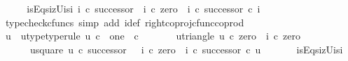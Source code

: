 \begin{isabellebody}
\ \ \isamarkupfalse%
\ \isamarkupfalse%
\ i{}{\isacharunderscore}{\kern0pt}sEqs{\isacharunderscore}{\kern0pt}i{}zUi{}s{\isacharunderscore}{\kern0pt}i{}{\isacharcolon}{\kern0pt}\ {\isachardoublequoteopen}i{}\ {\isasymcirc}\isactrlsub c\ successor\ {\isacharequal}{\kern0pt}\ {\isacharparenleft}{\kern0pt}{\isacharparenleft}{\kern0pt}i{}\ {\isasymcirc}\isactrlsub c\ zero{\isacharparenright}{\kern0pt}\ {\isasymamalg}\ {\isacharparenleft}{\kern0pt}i{}\ {\isasymcirc}\isactrlsub c\ successor{\isacharparenright}{\kern0pt}{\isacharparenright}{\kern0pt}\ {\isasymcirc}\isactrlsub c\ i{}{\isachardoublequoteclose}\isanewline
\ \ \ \ \isamarkupfalse%
\ {\isacharparenleft}{\kern0pt}typecheck{\isacharunderscore}{\kern0pt}cfuncs{\isacharcomma}{\kern0pt}\ simp\ add{\isacharcolon}{\kern0pt}\ i{}{\isacharunderscore}{\kern0pt}def\ right{\isacharunderscore}{\kern0pt}coproj{\isacharunderscore}{\kern0pt}cfunc{\isacharunderscore}{\kern0pt}coprod{\isacharparenright}{\kern0pt}\ \ \ \isanewline
\ \ \isamarkupfalse%
\ \isamarkupfalse%
\ u\ \ u{\isacharunderscore}{\kern0pt}type{\isacharbrackleft}{\kern0pt}type{\isacharunderscore}{\kern0pt}rule{\isacharbrackright}{\kern0pt}{\isacharcolon}{\kern0pt}\ {\isachardoublequoteopen}{\isacharparenleft}{\kern0pt}u{\isacharcolon}{\kern0pt}\ {\isasymnat}\isactrlsub c\ {\isasymrightarrow}\ {\isacharparenleft}{\kern0pt}one\ {\isasymCoprod}\ {\isasymnat}\isactrlsub c{\isacharparenright}{\kern0pt}{\isacharparenright}{\kern0pt}{\isachardoublequoteclose}\ \isanewline
\ \ \ \ \ \ u{\isacharunderscore}{\kern0pt}triangle{\isacharcolon}{\kern0pt}\ {\isachardoublequoteopen}u\ {\isasymcirc}\isactrlsub c\ zero\ {\isacharequal}{\kern0pt}\ i{}\ {\isasymcirc}\isactrlsub c\ zero{\isachardoublequoteclose}\ \isanewline
\ \ \ \ \ \ u{\isacharunderscore}{\kern0pt}square{\isacharcolon}{\kern0pt}\ {\isachardoublequoteopen}u\ {\isasymcirc}\isactrlsub c\ successor\ {\isacharequal}{\kern0pt}\ \ {\isacharparenleft}{\kern0pt}{\isacharparenleft}{\kern0pt}i{}\ {\isasymcirc}\isactrlsub c\ zero{\isacharparenright}{\kern0pt}\ {\isasymamalg}\ {\isacharparenleft}{\kern0pt}i{}\ {\isasymcirc}\isactrlsub c\ successor{\isacharparenright}{\kern0pt}{\isacharparenright}{\kern0pt}\ {\isasymcirc}\isactrlsub c\ u\ {\isachardoublequoteclose}\isanewline
\ \ \ \ \isamarkupfalse%
\ i{}{\isacharunderscore}{\kern0pt}sEqs{\isacharunderscore}{\kern0pt}i{}zUi{}s{\isacharunderscore}{\kern0pt}i{}\ \isamarkupfalse%

\end{isabellebody}
